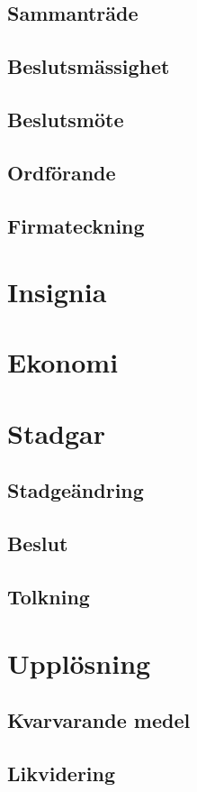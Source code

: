 \documentclass{article}
\begin{document}
\subsection{Sammanträde}

\subsection{Beslutsmässighet}

\subsection{Beslutsmöte}

\subsection{Ordförande}

\subsection{Firmateckning}

\section{Insignia}

\section{Ekonomi}

\section{Stadgar}
\subsection{Stadgeändring}
\subsection{Beslut}
\subsection{Tolkning}

\section{Upplösning}
\subsection{Kvarvarande medel}
\subsection{Likvidering}
\end{document}
